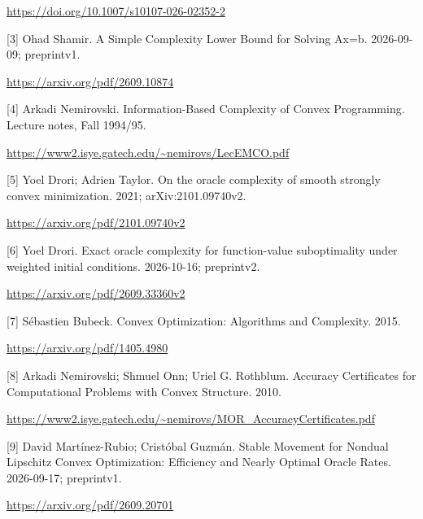 \documentclass[10pt,a4paper]{article}
\begin{document}
\url{https://doi.org/10.1007/s10107-026-02352-2}

[3] Ohad Shamir. A Simple Complexity Lower Bound for Solving Ax=b. 2026-09-09; preprintv1.

\url{https://arxiv.org/pdf/2609.10874}

[4] Arkadi Nemirovski. Information-Based Complexity of Convex Programming. Lecture notes, Fall 1994/95.

\url{https://www2.isye.gatech.edu/~nemirovs/LecEMCO.pdf}

[5] Yoel Drori; Adrien Taylor. On the oracle complexity of smooth strongly convex minimization. 2021; arXiv:2101.09740v2.

\url{https://arxiv.org/pdf/2101.09740v2}

[6] Yoel Drori. Exact oracle complexity for function-value suboptimality under weighted initial conditions. 2026-10-16; preprintv2.

\url{https://arxiv.org/pdf/2609.33360v2}

[7] Sébastien Bubeck. Convex Optimization: Algorithms and Complexity. 2015.

\url{https://arxiv.org/pdf/1405.4980}

[8] Arkadi Nemirovski; Shmuel Onn; Uriel G. Rothblum. Accuracy Certificates for Computational Problems with Convex Structure. 2010.

\url{https://www2.isye.gatech.edu/~nemirovs/MOR_AccuracyCertificates.pdf}

[9] David Martínez-Rubio; Cristóbal Guzmán. Stable Movement for Nondual Lipschitz Convex Optimization: Efficiency and Nearly Optimal Oracle Rates. 2026-09-17; preprintv1.

\url{https://arxiv.org/pdf/2609.20701}
\end{document}

